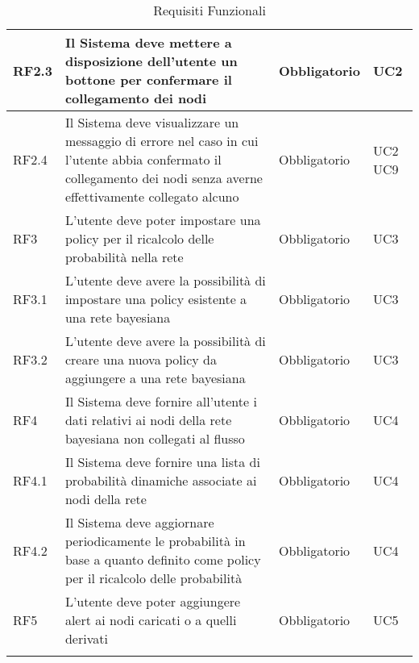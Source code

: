 \begin{center}
\begin{longtable}[c]{|m{}|m{}|m{}|m{}|}
\hline
RF2.3 & Il Sistema deve mettere a disposizione dell'utente un bottone per confermare il collegamento dei nodi & Obbligatorio & UC2\\
\hline
\rowcolor{grigio}RF2.4 & Il Sistema deve visualizzare un messaggio di errore nel caso in cui l'utente abbia confermato il collegamento dei nodi senza averne effettivamente collegato alcuno & Obbligatorio & UC2 UC9\\
\hline
RF3 & L'utente deve poter impostare una policy per il ricalcolo delle probabilità nella rete & Obbligatorio & UC3\\
\hline
\rowcolor{grigio}RF3.1 & L'utente deve avere la possibilità di impostare una policy esistente a una rete bayesiana  & Obbligatorio & UC3\\ 
\hline
RF3.2 & L'utente deve avere la possibilità di creare una nuova policy da aggiungere a una rete bayesiana & Obbligatorio & UC3\\
\hline
\rowcolor{grigio}RF4 & Il Sistema deve fornire all'utente i dati relativi ai nodi della rete bayesiana non collegati al flusso & Obbligatorio & UC4\\
\hline
RF4.1 & Il Sistema deve fornire una lista di probabilità dinamiche associate ai nodi della rete & Obbligatorio & UC4\\
\hline
\rowcolor{grigio}RF4.2 & Il Sistema deve aggiornare periodicamente le probabilità in base a quanto definito come policy per il ricalcolo delle probabilità & Obbligatorio & UC4\\
\hline
RF5 & L'utente deve poter aggiungere alert ai nodi caricati o a quelli derivati & Obbligatorio & UC5\\ 
\hline
\caption{Requisiti Funzionali}
\end{longtable}
\end{center}


